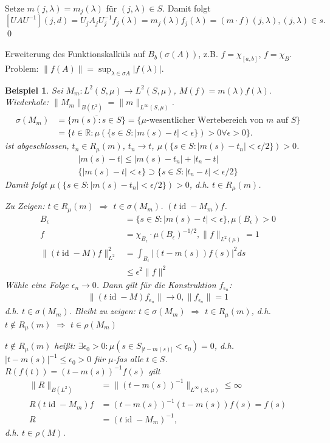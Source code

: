 \documentclass[12pt]{extreport} %
\newtheorem{Beispiel}[Satz]{Beispiel}
\DeclareMathOperator{\id}{id}
\numberwithin{equation}{section}
\newcommand{\R}{\mathbb{R}} %
\newcommand{\m}{\cdot}
\begin{document}
	Setze $m(j,\lambda) = m_j(\lambda)$ für $(j,\lambda)\in S$. Damit folgt 
	$$[UAU^{-1}] (j,d) = U_jA_jU_j^{-1}f_j(\lambda) = m_j(\lambda)f_j(\lambda) = (m\m f)(j,\lambda), (j,\lambda)\in s.$$
	\qed
	
	Erweiterung des Funktionskalküls auf $B_b(\sigma(A))$, z.B. $f = \chi_{[a,b]}$, $f = \chi_B$. Problem: $\|f(A)\| = \sup_{\lambda \in \sigma A}|f(\lambda)|$.
	
	\begin{Beispiel}
		Sei $M_m:L^2(S,\mu)\rightarrow L^2(S,\mu)$, $M(f) = m(\lambda)f(\lambda).$
		Wiederhole: 
		$\|M_m\|_{B(L^2)} = \|m\|_{L^\infty(S,\mu)}$.
		\begin{align*}
			\sigma(M_m) &= \overline{\{m(s): s\in S \}} = \{\mu\text{-wesentlicher Wertebereich von }m\text{ auf } S\} \\ 
			&= \{t\in \R:\mu(\{s\in S: |m(s)-t|<\epsilon \})>0\forall\epsilon > 0 \}.
		\end{align*}
		ist abgeschlossen, $t_n\in R_\mu(m)$, $t_n\rightarrow t$, $\mu(\{s\in S:|m(s)-t_n|<\epsilon/2 \})>0$.
		\begin{align*}
			|m(s)-t|\leq |m(s)-t_n|+|t_n-t|\\
			\{|m(s)-t|<\epsilon \} \supset \{s\in S:|t_n-t|<\epsilon/2 \}
		\end{align*}
		Damit folgt $\mu(\{s\in S:|m(s)-t_n|<\epsilon/2 \})> 0$, d.h. $t\in R_\mu(m)$.
		
		Zu Zeigen: $t\in R_\mu(m)$ $\Rightarrow$ $t\in \sigma(M_m)$. $(t\id - M_m)f$.
		\begin{align*}
			B_\epsilon &= \{s\in S: |m(s)-t|<\epsilon \}, \mu(B_\epsilon)>0\\
			f &= \chi_{B_\epsilon}\m \mu(B_\epsilon)^{-1/2}, \|f\|_{L^2(\mu)} = 1\\
			\|(t\id - M)f\|_{L^2}^2 &= \int_{B_\epsilon}|(t-m(s))f(s)|^2ds\\
			&\leq \epsilon^2 \|f\|^2
		\end{align*}
		Wähle eine Folge $\epsilon_n\rightarrow 0$. Dann gilt für die Konstruktion $f_{\epsilon_n}$:
		\begin{align*}
			\|(t\id - M) f_{\epsilon_n}\| \rightarrow 0, \|f_{\epsilon_n}\| = 1
		\end{align*}
		d.h. $t\in \sigma(M_m)$.
		Bleibt zu zeigen: $t\in \sigma(M_m)$ $\Rightarrow$ $t\in R_\mu(m)$, d.h. $t\notin R_\mu(m)$ $\Rightarrow$ $t\in \rho(M_m)$
		
		$t\notin R_\mu(m)$ heißt: $\exists \epsilon_0>0:\mu(s\in S_|t-m(s)|<\epsilon_0) = 0$, d.h. $|t-m(s)|^{-1}\leq \epsilon_0 >0$ für $\mu$-fas alle $t\in S$. $R(f(t)) = (t-m(s))^{-1}f(s)$ gilt
		\begin{align*}
			\|R\|_{B(L^2)} &= \|(t-m(s))^{-1}\|_{L^\infty(S,\mu)}\leq \infty\\
			R(t\id-M_m)f &= (t-m(s))^{-1}(t-m(s))f(s) = f(s)\\
			R &= (t\id - M_m)^{-1},
		\end{align*}
		d.h. $t\in \rho(M)$.
	\end{Beispiel}
	
\end{document}
